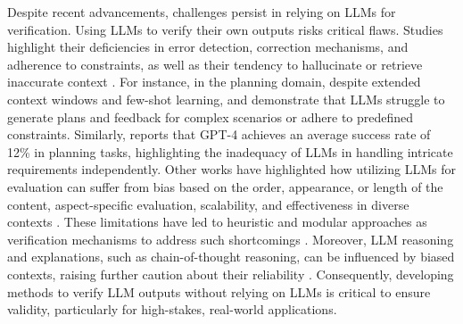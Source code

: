 {Despite recent advancements, challenges persist in relying on LLMs for verification. Using LLMs to verify their own outputs risks critical flaws. Studies highlight their deficiencies in error detection, correction mechanisms, and adherence to constraints, as well as their tendency to hallucinate or retrieve inaccurate context \cite{ji2024testing, yao2023llm, liu2024exploring}. 
For instance, in the planning domain, despite extended context windows and few-shot learning, \citet{xie2024travelplanner} and \citet{chen2024can} demonstrate that LLMs struggle to generate plans and feedback for complex scenarios or adhere to predefined constraints. Similarly, \citet{valmeekam2023planning} reports that GPT-4 achieves an average success rate of 12\% in planning tasks, highlighting the inadequacy of LLMs in handling intricate requirements independently.
Other works have highlighted how utilizing LLMs for evaluation can suffer from bias based on the order, appearance, or length of the content, aspect-specific evaluation, scalability, and effectiveness in diverse contexts \cite{wang2023large, huang2024empirical, koo2023benchmarking, son2024llm, park2024offsetbias}. 
These limitations have led to heuristic and modular approaches as verification mechanisms to address such shortcomings \cite{kambhampati2024llms, valmeekam2022large}. Moreover, LLM reasoning and explanations, such as chain-of-thought reasoning, can be influenced by biased contexts, raising further caution about their reliability \cite{turpin2024language}. Consequently, developing methods to verify LLM outputs without relying on LLMs is critical to ensure validity, particularly for high-stakes, real-world applications.

}







